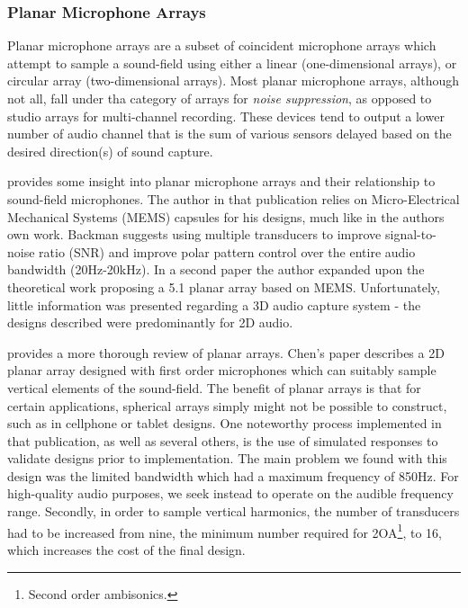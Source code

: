 \subsubsection{Planar Microphone Arrays}

Planar microphone arrays are a subset of coincident microphone arrays which attempt to sample a sound-field using either a linear (one-dimensional arrays), or circular array (two-dimensional arrays). Most planar microphone arrays, although not all, fall under tha category of arrays for \textit{noise suppression}, as opposed to studio arrays for multi-channel recording. These devices tend to output a lower number of audio channel that is the sum of various sensors delayed based on the desired direction(s) of sound capture. 

\cite{backman2006miniature} provides some insight into planar microphone arrays and their relationship to sound-field microphones. The author in that publication relies on Micro-Electrical Mechanical Systems (MEMS) capsules for his designs, much like in the authors own work. Backman suggests using multiple transducers to improve signal-to-noise ratio (SNR) and improve polar pattern control over the entire audio bandwidth (20Hz-20kHz). In a second paper \cite{backman2006gradient} the author expanded upon the theoretical work proposing a 5.1 planar array based on MEMS. Unfortunately, little information was presented regarding a 3D audio capture system - the designs described were predominantly for 2D audio. 


\cite{chen2015theory} provides a more thorough review of planar arrays. Chen's paper describes a 2D planar array designed with first order microphones which can suitably sample vertical elements of the sound-field. The benefit of planar arrays is that for certain applications, spherical arrays simply might not be possible to construct, such as in cellphone or tablet designs. One noteworthy process implemented in that publication, as well as several others, is the use of simulated responses to validate designs prior to implementation. The main problem we found with this design was the limited bandwidth which had a maximum frequency of 850Hz. For high-quality audio purposes, we seek instead to operate on the audible frequency range. Secondly, in order to sample vertical harmonics, the number of transducers had to be increased from nine, the minimum number required for 2OA\footnote{Second order ambisonics.}, to 16, which increases the cost of the final design. 

